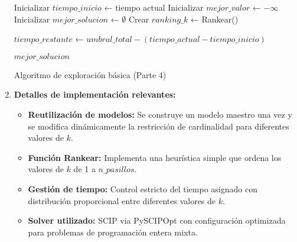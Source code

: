 \documentclass[a4paper,12pt]{article}
\begin{document}
\begin{enumerate}[label=(\alph*), leftmargin=2em]
\begin{algorithm}[H]
    Inicializar $tiempo\_inicio$ ← tiempo actual\;
    Inicializar $mejor\_valor$ ← $-\infty$\;
    Inicializar $mejor\_solucion$ ← $\emptyset$\;
    Crear $ranking\_k$ ← Rankear() 
    
    
    $tiempo\_restante$ ← $umbral\_total - (tiempo\_actual - tiempo\_inicio)$\;
    
    
    \Return $mejor\_solucion$\;
    
    \caption{Algoritmo de exploración básica (Parte 4)}
    \end{algorithm}

    \item \textbf{Detalles de implementación relevantes:}
    
    \begin{itemize}
        \item \textbf{Reutilización de modelos:} Se construye un modelo maestro una vez y se modifica dinámicamente la restricción de cardinalidad para diferentes valores de $k$.
        \item \textbf{Función Rankear:} Implementa una heurística simple que ordena los valores de $k$ de 1 a $n\_pasillos$.
        \item \textbf{Gestión de tiempo:} Control estricto del tiempo asignado con distribución proporcional entre diferentes valores de $k$.
        \item \textbf{Solver utilizado:} SCIP via PySCIPOpt con configuración optimizada para problemas de programación entera mixta.
    \end{itemize}

\end{enumerate}
\end{document}
